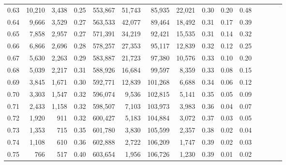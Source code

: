 \begin{tabular}{rrrcrrrrrrrrrrr}
0.63 &  10,210 &  3,438 &                                       0.25 &  553,867 &   51,743 &   85,935 &   22,021 &  0.30 &  0.20 &                         0.48 \\
0.64 &   9,666 &  3,529 &                                       0.27 &  563,533 &   42,077 &   89,464 &   18,492 &  0.31 &  0.17 &                         0.39 \\
0.65 &   7,858 &  2,957 &                                       0.27 &  571,391 &   34,219 &   92,421 &   15,535 &  0.31 &  0.14 &                         0.32 \\
0.66 &   6,866 &  2,696 &                                       0.28 &  578,257 &   27,353 &   95,117 &   12,839 &  0.32 &  0.12 &                         0.25 \\
0.67 &   5,630 &  2,263 &                                       0.29 &  583,887 &   21,723 &   97,380 &   10,576 &  0.33 &  0.10 &                         0.20 \\
0.68 &   5,039 &  2,217 &                                       0.31 &  588,926 &   16,684 &   99,597 &    8,359 &  0.33 &  0.08 &                         0.15 \\
0.69 &   3,845 &  1,671 &                                       0.30 &  592,771 &   12,839 &  101,268 &    6,688 &  0.34 &  0.06 &                         0.12 \\
0.70 &   3,303 &  1,547 &                                       0.32 &  596,074 &    9,536 &  102,815 &    5,141 &  0.35 &  0.05 &                         0.09 \\
0.71 &   2,433 &  1,158 &                                       0.32 &  598,507 &    7,103 &  103,973 &    3,983 &  0.36 &  0.04 &                         0.07 \\
0.72 &   1,920 &    911 &                                       0.32 &  600,427 &    5,183 &  104,884 &    3,072 &  0.37 &  0.03 &                         0.05 \\
0.73 &   1,353 &    715 &                                       0.35 &  601,780 &    3,830 &  105,599 &    2,357 &  0.38 &  0.02 &                         0.04 \\
0.74 &   1,108 &    610 &                                       0.36 &  602,888 &    2,722 &  106,209 &    1,747 &  0.39 &  0.02 &                         0.03 \\
0.75 &     766 &    517 &                                       0.40 &  603,654 &    1,956 &  106,726 &    1,230 &  0.39 &  0.01 &                         0.02 \\

\end{tabular}
